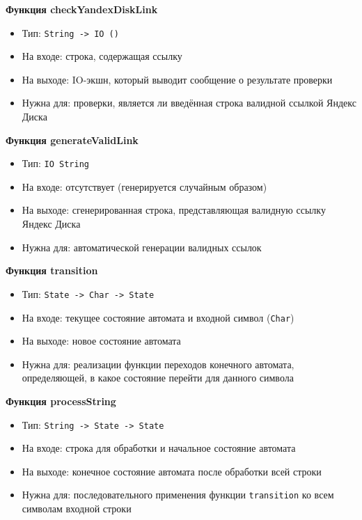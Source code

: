 \documentclass[areasetadvanced]{scrartcl}
\begin{document}
\textbf{Функция checkYandexDiskLink}
\begin{itemize}
  \item Тип: \texttt{String -> IO ()}
  \item На входе: строка, содержащая ссылку
  \item На выходе: IO-экшн, который выводит сообщение о результате проверки
  \item Нужна для: проверки, является ли введённая строка валидной ссылкой Яндекс Диска
\end{itemize}

\textbf{Функция generateValidLink}
\begin{itemize}
  \item Тип: \texttt{IO String}
  \item На входе: отсутствует (генерируется случайным образом)
  \item На выходе: сгенерированная строка, представляющая валидную ссылку Яндекс Диска
  \item Нужна для: автоматической генерации валидных ссылок
\end{itemize}

\textbf{Функция transition}
\begin{itemize}
  \item Тип: \texttt{State -> Char -> State}
  \item На входе: текущее состояние автомата и входной символ (\texttt{Char})
  \item На выходе: новое состояние автомата
  \item Нужна для: реализации функции переходов конечного автомата, определяющей, в какое состояние перейти для данного символа
\end{itemize}

\textbf{Функция processString}
\begin{itemize}
  \item Тип: \texttt{String -> State -> State}
  \item На входе: строка для обработки и начальное состояние автомата
  \item На выходе: конечное состояние автомата после обработки всей строки
  \item Нужна для: последовательного применения функции \texttt{transition} ко всем символам входной строки
\end{itemize}
\end{document}
